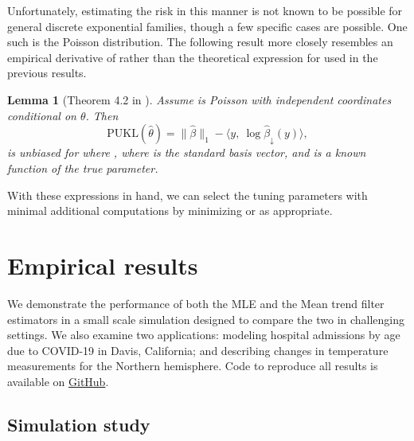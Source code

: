 \documentclass[ejs,noshowframe]{imsart}
\theoremstyle{plain}
\newtheorem{lemma}[theorem]{Lemma}
\theoremstyle{definition}
\newcommand{\snorm}[1]{\lVert #1 \rVert}
\newcommand{\E}{E}
\renewcommand{\hat}{\widehat}
\begin{document}
Unfortunately, estimating the risk in this manner is not known to be possible
for general discrete exponential 
families, though a few specific cases are possible. One such is the Poisson distribution. The
following result more closely resembles an empirical derivative of 
\smash{$\hat\beta$}
rather than the theoretical expression for \smash{$J\hat\beta(y)$} used in the 
previous
results. 

\begin{lemma}[Theorem 4.2 in \citealt{Deledalle2017}]
	Assume  is Poisson with independent coordinates conditional on
  $\theta$. Then 
	\begin{equation}
		\mathrm{PUKL}(\hat\theta) = \snorm{\hat\beta}_1 - \langle  y,\
		\log \hat\beta_{\downarrow}(y) \rangle, 
	\end{equation}
	is unbiased for \smash{$\E[\mathrm{KL}(\theta^*\ \Vert\ \hat\theta(Y))] -
    z(\theta^*)$}  
	where
	\smash{$[\hat\beta_{\downarrow}(y)]_i = [\hat\beta(y-e_i)]_i$}, where 
	\smash{$e_i$} 
	is the
	 standard basis vector, and  is a known
	function of the true parameter.
\end{lemma}

With these expressions in hand, we can select the tuning parameters 
\smash{$\lambda_1,\
\lambda_2$} with minimal additional computations by minimizing
\smash{$\mathrm{SUKL}(\hat\theta)$} or 
\smash{$\mathrm{PUKL}(\hat\theta)$} as appropriate.







\section{Empirical results}
\label{sec:experiments}

We demonstrate the performance of both the MLE and the Mean trend
filter estimators in a small 
scale simulation designed to compare the two in challenging settings. We also
examine two applications: modeling hospital admissions by age due to COVID-19
in Davis, California; and describing changes in temperature measurements for the
Northern hemisphere. Code to reproduce all results is available on 
\href{https://github.com/dajmcdon/tflattices}{GitHub}.

\subsection{Simulation study}
\end{document}
